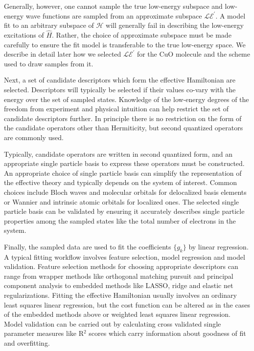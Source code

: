 \documentclass[12pt]{article}
\begin{document}
Generally, however, one cannot sample the true low-energy subspace and low-energy wave functions are sampled from an approximate subspace $\mathcal{LE}^\prime$.
A model fit to an arbitrary subspace of $\mathcal{H}$ will generally fail in describing the low-energy excitations of $\hat{H}$.
Rather, the choice of approximate subspace must be made carefully to ensure the fit model is transferable to the true low-energy space.
We describe in detail later how we selected $\mathcal{LE}^\prime$ for the CuO molecule and the scheme used to draw samples from it.

Next, a set of candidate descriptors which form the effective Hamiltonian are selected.
Descriptors will typically be selected if their values co-vary with the energy over the set of sampled states. 
Knowledge of the low-energy degrees of the freedom from experiment and physical intuition can help restrict the set of candidate descriptors further.
In principle there is no restriction on the form of the candidate operators other than Hermiticity, but second quantized operators are commonly used.

Typically, candidate operators are written in second quantized form, and an appropriate single particle basis to express these operators must be constructed.
An appropriate choice of single particle basis can simplify the representation of the effective theory and typically depends on the system of interest.
Common choices include Bloch waves and molecular orbitals for delocalized basis elements or Wannier and intrinsic atomic orbitals for localized ones.
The selected single particle basis can be validated by ensuring it accurately describes single particle properties among the sampled states like the total number of electrons in the system.

Finally, the sampled data are used to fit the coefficients $\{g_k\}$ by linear regression.
A typical fitting workflow involves feature selection, model regression and model validation.
Feature selection methods for choosing appropriate descriptors can range from wrapper methods like orthogonal matching pursuit and principal component analysis to embedded methods like LASSO, ridge and elastic net regularizations. 
Fitting the effective Hamiltonian usually involves an ordinary least squares linear regression, but the cost function can be altered as in the cases of the embedded methods above or weighted least squares linear regression.
Model validation can be carried out by calculating cross validated single parameter measures like R$^2$ scores which carry information about goodness of fit and overfitting.
\end{document}
